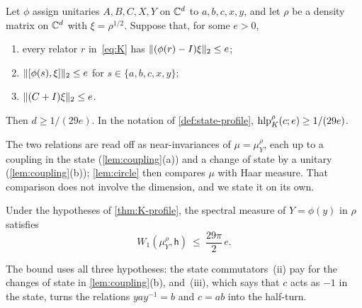 \begin{theorem}\label{thm:K-profile}
Let $\phi$ assign unitaries $A,B,C,X,Y$ on $\mathbb C^d$ to $a,b,c,x,y$, and let $\rho$ be a density matrix on $\mathbb C^d$ with $\xi=\rho^{1/2}$.
Suppose that, for some $e>0$,
\begin{enumerate}[label=(\roman*),itemsep=1pt]
\item every relator $r$ in~\eqref{eq:K} has $\lVert (\phi(r)-I)\xi\rVert_2\le e$;
\item $\lVert [\phi(s),\xi]\rVert_2\le e$ for $s\in\{a,b,c,x,y\}$;
\item $\lVert (C+I)\xi\rVert_2\le e$.
\end{enumerate}
Then $d\ge1/(29e)$. In the notation of \cref{def:state-profile}, $\operatorname{hlp}^{\rho}_K(c;e)\ge1/(29e)$.
\end{theorem}

The two relations are read off as near-invariances of $\mu=\mu^\rho_Y$, each up to a coupling in the state (\cref{lem:coupling}(a)) and a
change of state by a unitary (\cref{lem:coupling}(b)); \cref{lem:circle} then compares $\mu$ with Haar measure. That comparison does not
involve the dimension, and we state it on its own.

\begin{proposition}\label{prop:K-W1}
Under the hypotheses of \cref{thm:K-profile}, the spectral measure of $Y=\phi(y)$ in $\rho$ satisfies
\[
W_1(\mu^\rho_Y,\mathsf h)\ \le\ \frac{29\pi}2\,e .
\]
\end{proposition}

The bound uses all three hypotheses: the state commutators~(ii) pay for the changes of state in \cref{lem:coupling}(b), and~(iii), which
says that $c$ acts as $-1$ in the state, turns the relations $yay^{-1}=b$ and $c=ab$ into the half-turn.

